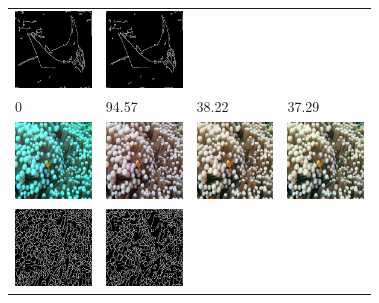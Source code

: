 \documentclass[conference]{IEEEtran}
\begin{document}
\begin{figure}
\begin{tabular}{p{1.7cm} p{1.7cm} p{1.7cm} p{1.5cm}}
   \includegraphics[width=0.8in]{n01496331_22079_u0edges}  &
   \includegraphics[width=0.8in]{n01496331_22079_u1edges}  \\
   0 & \small{94.57} & \small{38.22} & \small{37.29} \\

   \includegraphics[width=0.8in]{n02607072_4739_original} &
   \includegraphics[width=0.8in]{n02607072_4739_cimg} &
   \includegraphics[width=0.8in]{n02607072_4739_u0img} &
   \includegraphics[width=0.8in]{n02607072_4739_u1img} \\ [-1ex]
   \includegraphics[width=0.8in]{n02607072_4739_oedges} &
   \includegraphics[width=0.8in]{n02607072_4739_cedges} &

\end{tabular}
\end{figure}
\end{document}

